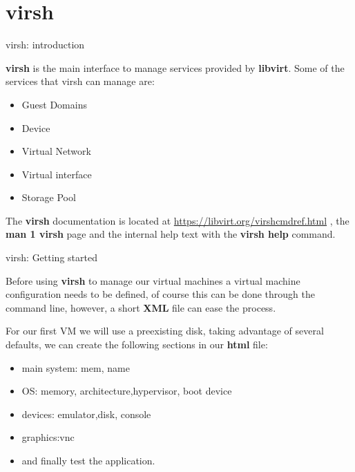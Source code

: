 \section{virsh}

\begin{frame}
   {virsh: introduction}

	\textbf{virsh} is the main interface to manage services provided by 
	\textbf{libvirt}. Some of the services that virsh can manage are:
   \begin{itemize}
      \item Guest Domains 
      \item Device 
      \item Virtual Network 
      \item Virtual interface
      \item Storage Pool
   \end{itemize}


   The \textbf{virsh} documentation is located at \url{https://libvirt.org/virshcmdref.html} ,
	the \textbf{man 1 virsh} page and the internal help text with 
	the \textbf{virsh help} command. 
	

\end{frame}

\cprotect{}

	

\begin{frame}
   {virsh: Getting started}

	Before using \textbf{virsh} to manage our virtual machines
	a virtual machine configuration needs to be defined, of course 
	this can be done through the command line, however, a short 
	\textbf{XML} file can ease the process. 

	For our first VM we will use a preexisting disk, taking advantage
	of several defaults, we can create the following sections in 
	our \textbf{html} file:

   \begin{itemize}
      \item main system: mem, name  
      \item OS: memory, architecture,hypervisor, boot device  
      \item devices: emulator,disk, console 
      \item graphics:vnc
      \item and finally test the application.
   \end{itemize}

\end{frame}

